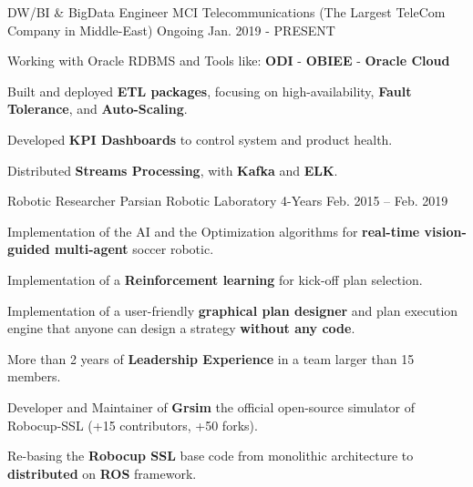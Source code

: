 

\begin{cventries}

  \cventry
    {DW/BI \& BigData Engineer} %
    {MCI Telecommunications (The Largest TeleCom Company in Middle-East)} %
    {Ongoing} %
    {Jan. 2019 - PRESENT} %
    {
      \begin{cvitems} %
        \item {Working with Oracle RDBMS and Tools like: \textbf{ODI} - \textbf{OBIEE} - \textbf{Oracle Cloud}}
        \item {Built and deployed \textbf{ETL packages}, focusing on high-availability, \textbf{Fault Tolerance}, and \textbf{Auto-Scaling}.}
        \item {Developed \textbf{KPI Dashboards} to control system and product health.}
        \item {Distributed \textbf{Streams Processing}, with \textbf{Kafka} and \textbf{ELK}.}
      \end{cvitems}
    }

  \cventry
    {Robotic Researcher} %
    {Parsian Robotic Laboratory} %
    {4-Years} %
    {Feb. 2015 -- Feb. 2019} %
    {
      \begin{cvitems} %
        \item Implementation of the AI and the Optimization algorithms for \textbf{real-time vision-guided multi-agent} soccer robotic.
        \item Implementation of a \textbf{Reinforcement learning} for kick-off plan selection.
        \item Implementation of a user-friendly \textbf{graphical plan designer} and plan execution engine that anyone can design a strategy \textbf{without any code}.
        \item More than 2 years of \textbf{Leadership Experience} in a team larger than 15 members.
        \item Developer and Maintainer of \textbf{Grsim} the official open-source simulator of Robocup-SSL (+15 contributors, +50 forks).
        \item Re-basing the \textbf{Robocup SSL} base code from monolithic architecture to \textbf{distributed} on \textbf{ROS} framework.
      \end{cvitems}
    }


\end{cventries}
